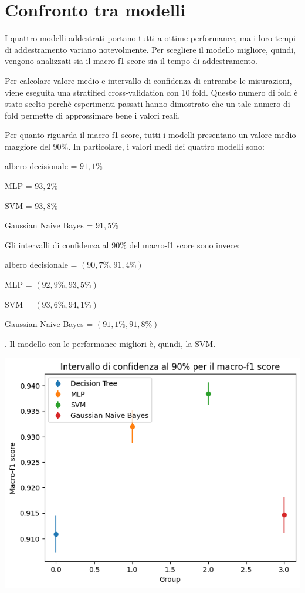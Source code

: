 \section{Confronto tra modelli}
I quattro modelli addestrati portano tutti a ottime performance, ma i loro 
tempi di addestramento variano notevolmente.
Per scegliere il modello migliore, quindi, vengono analizzati sia il macro-f1 score
sia il tempo di addestramento.

Per calcolare valore medio e intervallo di confidenza di entrambe
le misurazioni, viene eseguita
una stratified cross-validation con 10 fold. Questo numero di fold è stato 
scelto perchè esperimenti passati hanno dimostrato che un tale numero di fold
permette di approssimare bene i valori reali.

Per quanto riguarda il macro-f1 score, tutti i modelli presentano un
valore medio maggiore del $90\%$. In particolare, i valori medi dei quattro modelli
sono: \begin{itemize*}
    \item albero decisionale = $91,1\%$
    \item MLP = $93,2\%$
    \item SVM = $93,8\%$
    \item Gaussian Naive Bayes = $91,5\%$
\end{itemize*}
Gli intervalli di confidenza al $90\%$ del macro-f1 score sono invece:
\begin{itemize*}
    \item albero decisionale = $(90,7\%, 91,4\%)$
    \item MLP = $(92,9\%, 93,5\%)$
    \item SVM = $(93,6\%, 94,1\%)$
    \item Gaussian Naive Bayes = $(91,1\%, 91,8\%)$
\end{itemize*}.
Il modello con le performance migliori è, quindi, la SVM.

\begin{Figure}
    \centering
    \includegraphics[width=\linewidth]{img/confidence_interval_perf.png}
\end{Figure}

